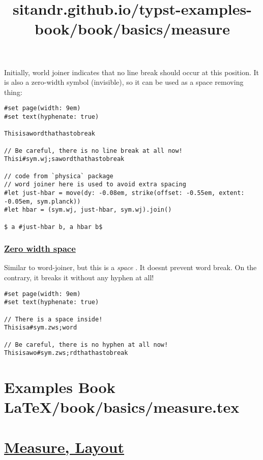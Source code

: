 Initially, world joiner indicates that no line break should occur at
this position. It is also a zero-width symbol (invisible), so it can be
used as a space removing thing:

\begin{verbatim}
#set page(width: 9em)
#set text(hyphenate: true)

Thisisawordthathastobreak

// Be careful, there is no line break at all now!
Thisi#sym.wj;sawordthathastobreak

// code from `physica` package
// word joiner here is used to avoid extra spacing
#let just-hbar = move(dy: -0.08em, strike(offset: -0.55em, extent: -0.05em, sym.planck))
#let hbar = (sym.wj, just-hbar, sym.wj).join()

$ a #just-hbar b, a hbar b$
\end{verbatim}

\pandocbounded{}

\subsubsection{\texorpdfstring{\hyperref[zero-width-space]{Zero width
space}}{Zero width space}}\label{zero-width-space}

Similar to word-joiner, but this is a \emph{space} . It
doesn\textquotesingle t prevent word break. On the contrary, it breaks
it without any hyphen at all!

\begin{verbatim}
#set page(width: 9em)
#set text(hyphenate: true)

// There is a space inside!
Thisisa#sym.zws;word

// Be careful, there is no hyphen at all now!
Thisisawo#sym.zws;rdthathastobreak
\end{verbatim}

\pandocbounded{}


\section{Examples Book LaTeX/book/basics/measure.tex}
\title{sitandr.github.io/typst-examples-book/book/basics/measure}

\section{\texorpdfstring{\hyperref[measure-layout]{Measure,
Layout}}{Measure, Layout}}\label{measure-layout}

